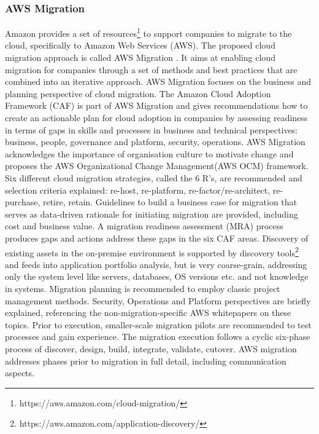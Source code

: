 \hypertarget{aws-migration}{%
\subsubsection{AWS Migration}\label{aws-migration}}

Amazon provides a set of resources\footnote{https://aws.amazon.com/cloud-migration/} to support companies to migrate to the cloud, specifically to Amazon Web Services (AWS).
The proposed cloud migration approach is called AWS Migration \autocite{AmazonWebServices2018Migration,AmazonWebServices2017CAF}.
It aims at enabling cloud migration for companies through a set of methods and best practices that are combined into an iterative approach.
AWS Migration focuses on the business and planning perspective of cloud migration.
The Amazon Cloud Adoption Framework (CAF) \autocite{AmazonWebServices2017CAF} is part of AWS Migration and gives recommendations how to create an actionable plan for cloud adoption in companies by assessing readiness in terms of gaps in skills and processes in business and technical perspectives: business, people, governance and platform, security, operations.
AWS Migration acknowledges the importance of organisation culture to motivate change and proposes the AWS Organizational Change Management(AWS OCM) framework.
Six different cloud migration strategies, called the 6 R's, are recommended and selection criteria explained: re-host, re-platform, re-factor/re-architect, re-purchase, retire, retain.
Guidelines to build a business case for migration that serves as data-driven rationale for initiating migration are provided, including cost and business value.
A migration readiness assessment (MRA) process produces gaps and actions address these gaps in the six CAF areas.
Discovery of existing assets in the on-premise environment is supported by discovery tools\footnote{https://aws.amazon.com/application-discovery/} and feeds into application portfolio analysis, but is very coarse-grain, addressing only the system level like servers, databases, OS versions etc.
and not knowledge in systems.
Migration planning is recommended to employ classic project management methods.
Security, Operations and Platform perspectives are briefly explained, referencing the non-migration-specific AWS whitepapers on these topics.
Prior to execution, smaller-scale migration pilots are recommended to test processes and gain experience.
The migration execution follows a cyclic six-phase process of discover, design, build, integrate, validate, cutover.
AWS migration addresses phases prior to migration in full detail, including communication aspects.
